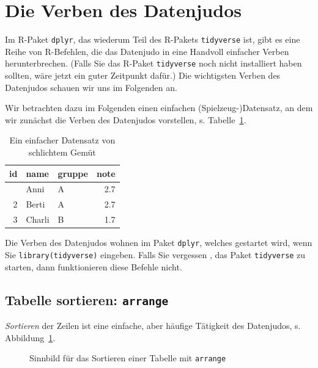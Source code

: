 \documentclass[
  letterpaper,
  twoside,
  open=any]{scrbook}
\theoremstyle{definition}
\theoremstyle{definition}
\theoremstyle{definition}
\theoremstyle{remark}
\begin{document}
\section{Die Verben des Datenjudos}\label{die-verben-des-datenjudos}

Im R-Paket \texttt{dplyr}, das wiederum Teil des R-Pakets
\texttt{tidyverse} ist, gibt es eine Reihe von R-Befehlen, die das
Datenjudo in eine Handvoll einfacher Verben herunterbrechen. (Falls Sie
das R-Paket \texttt{tidyverse} noch nicht installiert haben sollten,
wäre jetzt ein guter Zeitpunkt dafür.) Die wichtigsten Verben des
Datenjudos schauen wir uns im Folgenden an.

Wir betrachten dazu im Folgenden einen einfachen (Spielzeug-)Datensatz,
an dem wir zunächst die Verben des Datenjudos vorstellen, s.
Tabelle~\ref{tbl-datenjudo}.

\begin{longtable}[]{@{}rllr@{}}

\caption{\label{tbl-datenjudo}Ein einfacher Datensatz von schlichtem
Gemüt}

\tabularnewline

\toprule\noalign{}
id & name & gruppe & note \\
\midrule\noalign{}
\endhead
\bottomrule\noalign{}
\endlastfoot
1 & Anni & A & 2.7 \\
2 & Berti & A & 2.7 \\
3 & Charli & B & 1.7 \\

\end{longtable}

Die Verben des Datenjudos wohnen im Paket \texttt{dplyr}, welches
gestartet wird, wenn Sie \texttt{library(tidyverse)} eingeben. Falls Sie
vergessen , das Paket \texttt{tidyverse} zu starten, dann funktionieren
diese Befehle nicht.

\subsection{\texorpdfstring{Tabelle sortieren:
\texttt{arrange}}{Tabelle sortieren: arrange}}\label{tabelle-sortieren-arrange}

\emph{Sortieren} der Zeilen ist eine einfache, aber häufige Tätigkeit
des Datenjudos, s. Abbildung~\ref{fig-arrange}.

\begin{figure}


\caption{\label{fig-arrange}Sinnbild für das Sortieren einer Tabelle mit
\texttt{arrange}}

\end{figure}%
\end{document}
